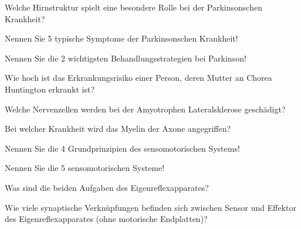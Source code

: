 \documentclass[10pt, a4paper]{exam}
\begin{document}
\begin{questions}
\begin{solution}
  \end{solution}

  \question Welche Hirnstruktur spielt eine besondere Rolle bei der Parkinsonschen Krankheit?
  \begin{solution}

  \end{solution}

  \question Nennen Sie 5 typische Symptome der Parkinsonschen Krankheit!
  \begin{solution}

  \end{solution}

  \question Nennen Sie die 2 wichtigsten Behandlungsstrategien bei Parkinson!
  \begin{solution}

  \end{solution}

  \question Wie hoch ist das Erkrankungsrisiko einer Person, deren Mutter an Chorea Huntington erkrankt ist?
  \begin{solution}

  \end{solution}

  \question Welche Nervenzellen werden bei der Amyotrophen Lateralsklerose geschädigt?
  \begin{solution}

  \end{solution}

  \question Bei welcher Krankheit wird das Myelin der Axone angegriffen?
  \begin{solution}

  \end{solution}

  \question Nennen Sie die 4 Grundprinzipien des sensomotorischen Systems!
  \begin{solution}

  \end{solution}

  \question Nennen Sie die 5 sensomotorischen Systeme!
  \begin{solution}

  \end{solution}

  \question Was sind die beiden Aufgaben des Eigenreflexapparates?
  \begin{solution}

  \end{solution}

  \question Wie viele synaptische Verknüpfungen befinden sich zwischen Sensor und Effektor des Eigenreflexapparates (ohne motorische Endplatten)?
  \begin{solution}


\end{solution}
\end{questions}
\end{document}
